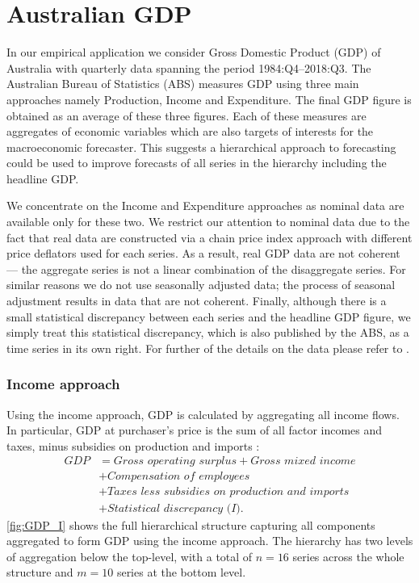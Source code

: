 \documentclass[graybox]{svmult}
\begin{document}
\section{Australian GDP}\label{sec:data}

In our empirical application we consider Gross Domestic Product (GDP) of Australia with quarterly data spanning the period 1984:Q4--2018:Q3. The Australian Bureau of Statistics (ABS) measures GDP using three main approaches namely Production, Income and Expenditure. The final GDP figure is obtained as an average of these three figures. Each of these measures are aggregates of economic variables which are also targets of interests for the macroeconomic forecaster. This suggests a hierarchical approach to forecasting could be used to improve forecasts of all series in the hierarchy including the headline GDP.

We concentrate on the Income and Expenditure approaches as nominal data are available only for these two. We restrict our attention to nominal data due to the fact that real data are constructed via a chain price index approach with different price deflators used for each series. As a result, real GDP data are not coherent --- the aggregate series is not a linear combination of the disaggregate series. For similar reasons we do not use seasonally adjusted data; the process of seasonal adjustment results in data that are not coherent. Finally, although there is a small statistical discrepancy between each series and the headline GDP figure, we simply treat this statistical discrepancy, which is also published by the ABS, as a time series in its own right. For further of the details on the data please refer to \citet{ABS2018}.


\subsubsection*{Income approach}

Using the income approach, GDP is calculated by aggregating all income flows. In particular, GDP at purchaser's price is the sum of all factor incomes and taxes, minus subsidies on production and imports \citep{ABS2015}:
\begin{align*}
	\textit{GDP}
	  & = \textit{Gross operating surplus} + \textit{Gross mixed income} \\
	  & + \textit{Compensation of employees} \\
	  & + \textit{Taxes less subsidies on production and imports} \\
	  & + \textit{Statistical discrepancy (I)}.
\end{align*}
\autoref{fig:GDP_I} shows the full hierarchical structure capturing all components aggregated to form GDP using the income approach. The hierarchy has two levels of aggregation below the top-level, with a total of $n=16$ series across the whole structure and $m=10$ series at the bottom level.
\end{document}
